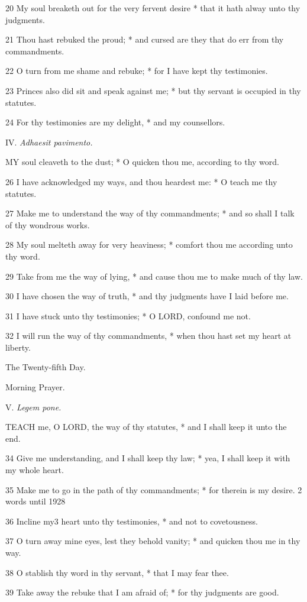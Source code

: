 20 My soul breaketh out for the very fervent desire
* that it hath alway unto thy judgments.

21 Thou hast rebuked the proud; * and cursed are they
that do err from thy commandments.

22 O turn from me shame and rebuke; * for I have kept
thy testimonies.

23 Princes also did sit and speak against me; * but
thy servant is occupied in thy statutes.

24 For thy testimonies are my delight, * and my counsellors.

IV. \emph{Adhaesit
pavimento.}

MY
soul cleaveth to the dust; * O quicken thou me, according to thy word.

26 I have acknowledged my ways, and thou heardest me:
* O teach me thy statutes.

27 Make me to understand the way of thy commandments;
* and so shall I talk of thy wondrous works.

28 My soul melteth away for very heaviness; * comfort
thou me according unto thy word.

29 Take from me the way of lying, * and cause thou
me to make much of thy law.

30 I have chosen the way of truth, * and thy judgments
have I laid before me.

31 I have stuck unto thy testimonies; * O LORD, confound
me not.

32 I will run the way of thy commandments, * when thou
hast set my heart at liberty. 

The
Twenty-fifth Day.

Morning
Prayer.

V. \emph{Legem
pone.}

TEACH
me, O LORD, the way of thy statutes, * and I shall keep it unto the end.

34 Give me understanding, and I shall keep thy law;
* yea, I shall keep it with my whole heart.

35 Make me to go in the path of thy commandments; *
for therein is my desire. 2 words until
1928

36 Incline my3 heart unto thy testimonies, * and not to covetousness.

37 O turn away mine eyes, lest they behold vanity; *
and quicken thou me in thy way.

38 O stablish thy word in thy servant, * that I may fear
thee.

39 Take away the rebuke that I am afraid of; * for thy
judgments are good.

